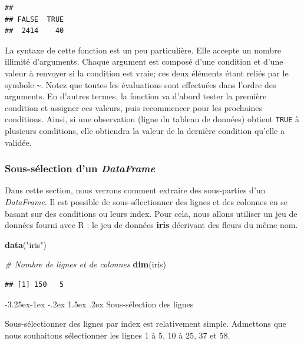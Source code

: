 \documentclass[
  11pt,
  french,
]{book}
\makeatletter
\newenvironment{Shaded}{\begin{snugshade}}{\end{snugshade}}
\newcommand{\CommentTok}[1]{\textcolor[rgb]{0.56,0.35,0.01}{\textit{#1}}}
\newcommand{\KeywordTok}[1]{\textcolor[rgb]{0.13,0.29,0.53}{\textbf{#1}}}
\newcommand{\NormalTok}[1]{#1}
\newcommand{\StringTok}[1]{\textcolor[rgb]{0.31,0.60,0.02}{#1}}
\newenvironment{kframe}{%
\medskip{}
\setlength{\fboxsep}{.8em}
 \def\at@end@of@kframe{}%
 \ifinner\ifhmode%
  \def\at@end@of@kframe{\end{minipage}}%
  \begin{minipage}{\columnwidth}%
 \fi\fi%
 \def\FrameCommand##1{\hskip\@totalleftmargin \hskip-\fboxsep
 \colorbox{shadecolor}{##1}\hskip-\fboxsep
     \hskip-\linewidth \hskip-\@totalleftmargin \hskip\columnwidth}%
 \MakeFramed {\advance\hsize-\width
   \@totalleftmargin\z@ \linewidth\hsize
   \@setminipage}}%
 {\par\unskip\endMakeFramed%
 \at@end@of@kframe}
\renewenvironment{Shaded}{\begin{kframe}}{\end{kframe}}
\renewcommand\paragraph{\@startsection{paragraph}{4}{\z@}%
   {-3.25ex\@plus -1ex \@minus -.2ex}%
   {1.5ex \@plus .2ex}%
   {\normalfont\normalsize\bfseries}}
\makeatother
\begin{document}
\begin{verbatim}
## 
## FALSE  TRUE 
##  2414    40
\end{verbatim}

La syntaxe de cette fonction est un peu particulière. Elle accepte un nombre illimité d'arguments. Chaque argument est composé d'une condition et d'une valeur à renvoyer si la condition est vraie; ces deux éléments étant reliés par le symbole \texttt{\textasciitilde{}}. Notez que toutes les évaluations sont effectuées dans l'ordre des arguments. En d'autres termes, la fonction va d'abord tester la première condition et assigner ces valeurs, puis recommencer pour les prochaines conditions. Ainsi, si une observation (ligne du tableau de données) obtient \texttt{TRUE} à plusieurs conditions, elle obtiendra la valeur de la dernière condition qu'elle a validée.

\hypertarget{sect01428}{%
\subsubsection{\texorpdfstring{Sous-sélection d'un \emph{DataFrame}}{Sous-sélection d'un DataFrame}}\label{sect01428}}

Dans cette section, nous verrons comment extraire des sous-parties d'un \emph{DataFrame}. Il est possible de sous-sélectionner des lignes et des colonnes en se basant sur des conditions ou leurs index. Pour cela, nous allons utiliser un jeu de données fourni avec R : le jeu de données \textbf{iris} décrivant des fleurs du même nom.

\begin{Shaded}
\begin{Highlighting}[]
\KeywordTok{data}\NormalTok{(}\StringTok{"iris"}\NormalTok{)}

\CommentTok{# Nombre de lignes et de colonnes}
\KeywordTok{dim}\NormalTok{(iris)}
\end{Highlighting}
\end{Shaded}

\begin{verbatim}
## [1] 150   5
\end{verbatim}

\hypertarget{sect014281}{%
\paragraph{Sous-sélection des lignes}\label{sect014281}}

Sous-sélectionner des lignes par index est relativement simple. Admettons que nous souhaitons sélectionner les lignes 1 à 5, 10 à 25, 37 et 58.
\end{document}
